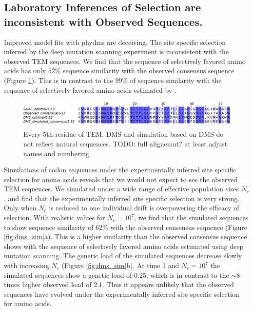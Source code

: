 \documentclass[12pt]{article}
\begin{document}
\subsection*{Laboratory Inferences of Selection are inconsistent with Observed Sequences.}
Improved model fits with phydms are deceiving.
The site specific selection inferred by the deep mutation scanning experiment is inconsistent with the observed TEM sequences.
We find that the sequence of selectively favored amino acids has only $52 \%$ sequence similarity with the observed consensus sequence (Figure \ref{fig:sim_seqs_cons}).
This is in contrast to the $99 \%$ of sequence similarity with the sequence of selectively favored amino acids estimated by \selac.

\begin{figure}[H]
     \centering
	\includegraphics[width=\textwidth]{img/seq_simil_short.pdf}
	\caption{Every 5th residue of TEM. DMS and simulation based on DMS do not reflect natural sequences. TODO: full alignemnt? at least adjust names and numbering}
	\label{fig:sim_seqs_cons}
\end{figure}

Simulations of codon sequences under the experimentally inferred site specific selection for amino acids reveals that we would not expect to see the observed TEM sequences.
We simulated under a wide range of effective population sizes $N_e$, and find that the experimentally inferred site specific selection is very strong.
Only when $N_e$ is reduced to one individual drift is overpowering the efficacy of selection.
With realistic values for $N_e = 10^7$, we find that the simulated sequences to show sequence similarity of $62 \%$ with the observed consensus sequence (Figure \ref{fig:dms_sim}a).
This is a higher similarity than the observed consensus sequence shows with the sequence of selectively favored amino acids estimated using deep mutation scanning.
The genetic load of the simulated sequences decrease slowly with increasing $N_e$ (Figure \ref{fig:dms_sim}b).
At time 1 and $N_e = 10^7$ the simulated sequences show a genetic load of 0.25, which is in contrast to the $\sim 8$ times higher observed load of $2.1$.
Thus it appears unlikely that the observed sequences have evolved under the experimentally inferred site specific selection for amino acids.
\end{document}
